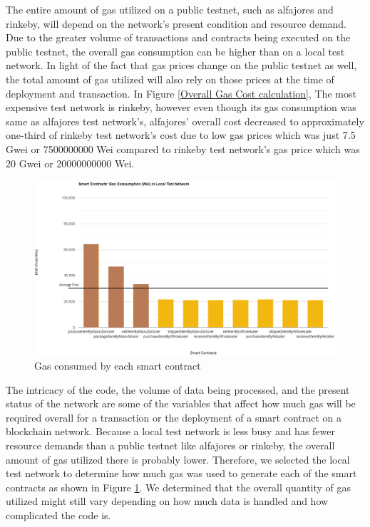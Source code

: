 The entire amount of gas utilized on a public testnet, such as alfajores and rinkeby, will depend on the network's present condition and resource demand. Due to the greater volume of transactions and contracts being executed on the public testnet, the overall gas consumption can be higher than on a local test network. In light of the fact that gas prices change on the public testnet as well, the total amount of gas utilized will also rely on those prices at the time of deployment and transaction. In Figure \ref{Overall Gas Cost calculation}, The most expensive test network is rinkeby, however even though its gas consumption was same as alfajores test network's, alfajores' overall cost decreased to approximately one-third of rinkeby test network's cost due to low gas prices which was just 7.5 Gwei or 7500000000 Wei compared to rinkeby test network's gas price which was 20 Gwei or 20000000000 Wei.

\begin{figure}[h]
\centering
  \includegraphics[width=12cm]{includes/figures/smartcontractgas.png} 
  \caption{Gas consumed by each smart contract}
  \label{Gas consumed by each contract}
\end{figure}

\vspace{.5cm}
The intricacy of the code, the volume of data being processed, and the present status of the network are some of the variables that affect how much gas will be required overall for a transaction or the deployment of a smart contract on a blockchain network. Because a local test network is less busy and has fewer resource demands than a public testnet like alfajores or rinkeby, the overall amount of gas utilized there is probably lower. Therefore, we selected the local test network to determine how much gas was used to generate each of the smart contracts as shown in Figure \ref{Gas consumed by each contract}. We determined that the overall quantity of gas utilized might still vary depending on how much data is handled and how complicated the code is.


